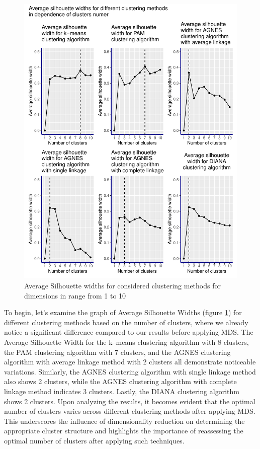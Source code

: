 \documentclass[11pt,a4paper]{article}\usepackage[]{graphicx}\usepackage[]{xcolor}
\makeatletter
\def\maxwidth{ %
  \ifdim\Gin@nat@width>\linewidth
    \linewidth
  \else
    \Gin@nat@width
  \fi
}
\newenvironment{knitrout}{}{} %
\makeatother
\begin{document}
\begin{knitrout}
\color{fgcolor}\begin{figure}
\includegraphics[width=\maxwidth]{figure/clusters_number_all-1} \caption[Average Silhouette widths for considered clustering methods for dimensions in range from 1 to 10]{Average Silhouette widths for considered clustering methods for dimensions in range from 1 to 10}\label{fig:clusters_number_all}
\end{figure}

\end{knitrout}
  To begin, let's examine the graph of Average Silhouette Widths (figure \ref{fig:clusters_number_all}) for different clustering methods based on the number of clusters, where we already notice a significant difference compared to our results before applying MDS. The Average Silhouette Width for the k--means clustering algorithm with 8 clusters, the PAM clustering algorithm with 7 clusters, and the AGNES clustering algorithm with average linkage method with 2 clusters all demonstrate noticeable variations. Similarly, the AGNES clustering algorithm with single linkage method also shows 2 clusters, while the AGNES clustering algorithm with complete linkage method indicates 3 clusters. Lastly, the DIANA clustering algorithm shows 2 clusters. Upon analyzing the results, it becomes evident that the optimal number of clusters varies across different clustering methods after applying MDS. This underscores the influence of dimensionality reduction on determining the appropriate cluster structure and highlights the importance of reassessing the optimal number of clusters after applying such techniques. 
\end{document}

